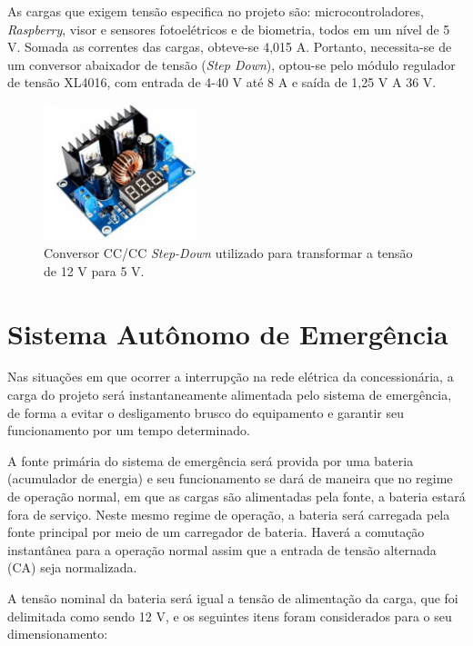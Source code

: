 As cargas que exigem tensão especifica no projeto são: microcontroladores, \emph{Raspberry}, visor e sensores fotoelétricos e de biometria, todos em um nível de 5 V. Somada as correntes das cargas, obteve-se 4,015 A. Portanto, necessita-se de um conversor abaixador de tensão (\textit{Step Down}), optou-se pelo módulo regulador de tensão XL4016, com entrada de 4-40 V até 8 A e saída de 1,25 V A 36 V. 

\begin{figure}[H]
\centering
    \includegraphics[width=0.4\textwidth]{figuras/energia/fotos_componentes/barramento_5V.png}
    \caption{Conversor CC/CC \textit{Step-Down} utilizado para transformar a tensão de 12 V para 5 V.}
\end{figure}

\section{Sistema Autônomo de Emergência}

Nas situações em que ocorrer a interrupção na rede elétrica da concessionária, a carga do projeto será instantaneamente alimentada pelo sistema de emergência, de forma a evitar o desligamento brusco do equipamento e garantir seu funcionamento por um tempo determinado. 

A fonte primária do sistema de emergência será provida por uma bateria (acumulador de energia) e seu funcionamento se dará de maneira que no regime de operação normal, em que as cargas são alimentadas pela fonte, a bateria estará fora de serviço. Neste mesmo regime de operação, a bateria será carregada pela fonte principal por meio de um carregador de bateria. Haverá a comutação instantânea para a operação normal assim que a entrada de tensão alternada (CA) seja normalizada.

A tensão nominal da bateria será igual a tensão de alimentação da carga, que foi delimitada como sendo 12 V, e os seguintes itens foram considerados para o seu dimensionamento:

